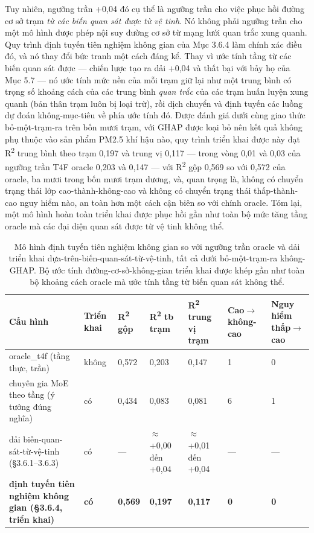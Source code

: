 Tuy nhiên, ngưỡng trần +0,04 đó cụ thể là ngưỡng trần cho việc phục hồi đường cơ sở trạm \emph{từ các biến quan sát được từ vệ tinh}. Nó không phải ngưỡng trần cho một mô hình được phép nội suy đường cơ sở từ mạng lưới quan trắc xung quanh. Quy trình định tuyến tiên nghiệm không gian của Mục 3.6.4 làm chính xác điều đó, và nó thay đổi bức tranh một cách đáng kể. Thay vì ước tính tầng từ các biến quan sát được --- chiến lược tạo ra dải +0,04 và thất bại với bảy họ của Mục 5.7 --- nó ước tính mức nền của mỗi trạm giữ lại như một trung bình có trọng số khoảng cách của các trung bình \emph{quan trắc} của các trạm huấn luyện xung quanh (bản thân trạm luôn bị loại trừ), rồi dịch chuyển và định tuyến các luồng dự đoán không-mục-tiêu về phía ước tính đó. Được đánh giá dưới cùng giao thức bỏ-một-trạm-ra trên bốn mươi trạm, với GHAP được loại bỏ nên kết quả không phụ thuộc vào sản phẩm PM2.5 khí hậu nào, quy trình triển khai được này đạt R\textsuperscript{2} trung bình theo trạm 0,197 và trung vị 0,117 --- trong vòng 0,01 và 0,03 của ngưỡng trần T4F oracle 0,203 và 0,147 --- với R\textsuperscript{2} gộp 0,569 so với 0,572 của oracle, ba mươi trong bốn mươi trạm dương, và, quan trọng là, không có chuyển trạng thái lớp cao-thành-không-cao và không có chuyển trạng thái thấp-thành-cao nguy hiểm nào, an toàn hơn một cách cận biên so với chính oracle. Tóm lại, một mô hình hoàn toàn triển khai được phục hồi gần như toàn bộ mức tăng tầng oracle mà các đại diện quan sát được từ vệ tinh không thể.

{\small
\begin{longtable}{lllllll}
\caption{Mô hình định tuyến tiên nghiệm không gian so với ngưỡng trần oracle và dải triển khai dựa-trên-biến-quan-sát-từ-vệ-tinh, tất cả dưới bỏ-một-trạm-ra không-GHAP. Bộ ước tính đường-cơ-sở-không-gian triển khai được khép gần như toàn bộ khoảng cách oracle mà ước tính tầng từ biến quan sát không thể.}\\
\toprule
\textbf{Cấu hình} & \textbf{Triển khai} & \textbf{R\textsuperscript{2} gộp} & \textbf{R\textsuperscript{2} tb trạm} & \textbf{R\textsuperscript{2} trung vị trạm} & \textbf{Cao$\rightarrow$không-cao} & \textbf{Nguy hiểm thấp$\rightarrow$cao} \\
\midrule\endhead
oracle\_t4f (tầng thực, trần) & không & 0,572 & 0,203 & 0,147 & 1 & 0 \\
chuyên gia MoE theo tầng (ý tưởng đúng nghĩa) & có & 0,434 & 0,083 & 0,081 & 6 & 1 \\
dải biến-quan-sát-từ-vệ-tinh (§3.6.1--3.6.3) & có & --- & $\approx$ +0,00 đến +0,04 & $\approx$ +0,01 đến +0,04 & --- & --- \\
\textbf{định tuyến tiên nghiệm không gian (§3.6.4, triển khai)} & \textbf{có} & \textbf{0,569} & \textbf{0,197} & \textbf{0,117} & \textbf{0} & \textbf{0} \\
\bottomrule
\end{longtable}
}


